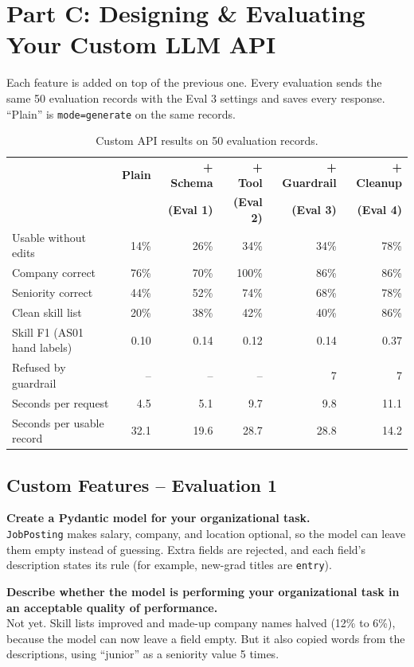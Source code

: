 \documentclass[11pt]{article}
\newcommand{\q}[1]{\par\noindent\textbf{#1}\\}
\begin{document}
\section{Part C: Designing \& Evaluating Your Custom LLM API}

Each feature is added on top of the previous one. Every evaluation sends the same 50 evaluation records with the Eval 3 settings and saves every response. ``Plain'' is \texttt{mode=generate} on the same records.

\begin{table}[H]
\centering
\small
\begin{tabular}{lrrrrr}
\toprule
& \textbf{Plain} & \textbf{+ Schema} & \textbf{+ Tool} & \textbf{+ Guardrail} & \textbf{+ Cleanup} \\
& & \textbf{(Eval 1)} & \textbf{(Eval 2)} & \textbf{(Eval 3)} & \textbf{(Eval 4)} \\
\midrule
Usable without edits & 14\% & 26\% & 34\% & 34\% & 78\% \\
Company correct & 76\% & 70\% & 100\% & 86\% & 86\% \\
Seniority correct & 44\% & 52\% & 74\% & 68\% & 78\% \\
Clean skill list & 20\% & 38\% & 42\% & 40\% & 86\% \\
Skill F1 (AS01 hand labels) & 0.10 & 0.14 & 0.12 & 0.14 & 0.37 \\
Refused by guardrail & -- & -- & -- & 7 & 7 \\
Seconds per request & 4.5 & 5.1 & 9.7 & 9.8 & 11.1 \\
Seconds per usable record & 32.1 & 19.6 & 28.7 & 28.8 & 14.2 \\
\bottomrule
\end{tabular}
\caption{Custom API results on 50 evaluation records.}
\end{table}

\subsection{Custom Features -- Evaluation 1}

\q{Create a Pydantic model for your organizational task.}
\texttt{JobPosting} makes salary, company, and location optional, so the model can leave them empty instead of guessing. Extra fields are rejected, and each field's description states its rule (for example, new-grad titles are \texttt{entry}).

\q{Describe whether the model is performing your organizational task in an acceptable quality of performance.}
Not yet. Skill lists improved and made-up company names halved (12\% to 6\%), because the model can now leave a field empty. But it also copied words from the descriptions, using ``junior'' as a seniority value 5 times.
\end{document}
